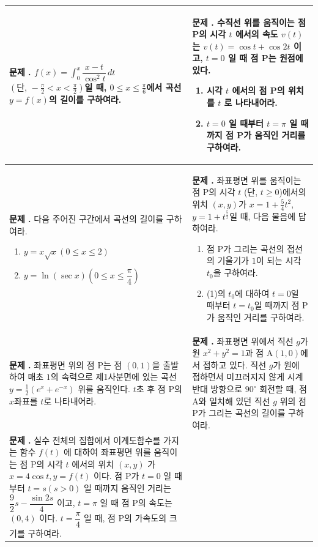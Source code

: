 \documentclass[10pt, a4paper]{article}
\newcounter{probcount}
\newcommand{\exercise}[1]{%
    \stepcounter{probcount}%
    \begin{minipage}[t][120mm][t]{0.44\textwidth}
        \small 
        \vspace{1mm}
        \noindent \textbf{문제 \arabic{probcount}.} #1
    \end{minipage}%
}
\begin{document}
\noindent
\begin{longtable}{p{} | p{}}
    
    \exercise{$f(x)=\int_{0}^{x} \dfrac{x-t}{\cos^2 t} \,dt$ $\left(\text{단, } -\frac{\pi}{2} < x < \frac{\pi}{2}\right)$일 때, $0 \le x \le \frac{\pi}{6}$에서 곡선 $y=f(x)$의 길이를 구하여라.} 
    & 
    \exercise{수직선 위를 움직이는 점 P의 시각 $t$ 에서의 속도 $v(t)$ 는 $v(t) = \cos t + \cos 2t$ 이고, $t=0$ 일 때 점 P는 원점에 있다. 
    \begin{enumerate}[label=(\arabic*), leftmargin=8mm, nosep]
        \item 시각 $t$ 에서의 점 P의 위치를 $t$ 로 나타내어라.
        \item $t=0$ 일 때부터 $t=\pi$ 일 때까지 점 P가 움직인 거리를 구하여라.
    \end{enumerate}} \\
    \hline 
    
    \exercise{다음 주어진 구간에서 곡선의 길이를 구하여라.
    \begin{enumerate}[label=(\arabic*), leftmargin=8mm, nosep]
        \item $y = x\sqrt{x} (0 \le x \le 2)$
        \item $y = \ln(\sec x) (0 \le x \le \dfrac{\pi}{4})$
    \end{enumerate}} 
    & 
    \exercise{좌표평면 위를 움직이는 점 $\text{P}$의 시각 $t$ (단, $t \ge 0$)에서의 위치 $(x, y)$가 $x = 1 + \frac{5}{4}t^2$, $y = 1 + t^{\frac{5}{2}}$일 때, 다음 물음에 답하여라.
    \begin{enumerate}
        \item[(1)] 점 $\text{P}$가 그리는 곡선의 접선의 기울기가 $1$이 되는 시각 $t_0$을 구하여라.
        \item[(2)] (1)의 $t_0$에 대하여 $t=0$일 때부터 $t=t_0$일 때까지 점 $\text{P}$가 움직인 거리를 구하여라.
    \end{enumerate}} \\


    \exercise{좌표평면 위의 점 $\text{P}$는 점 $(0, 1)$을 출발하여 매초 $1$의 속력으로 제1사분면에 있는 곡선 $y=\frac{1}{2}(e^x+e^{-x})$ 위를 움직인다. $t$초 후 점 $\text{P}$의 $x$좌표를 $t$로 나타내어라.} 
    & 
    \exercise{좌표평면 위에서 직선 $g$가 원 $x^2+y^2=1$과 점 $\text{A}(1, 0)$에서 접하고 있다. 직선 $g$가 원에 접하면서 미끄러지지 않게 시계 반대 방향으로 $90^\circ$ 회전할 때, 점 $\text{A}$와 일치해 있던 직선 $g$ 위의 점 $\text{P}$가 그리는 곡선의 길이를 구하여라.} \\
    \hline

    \exercise{실수 전체의 집합에서 이계도함수를 가지는 함수 $f(t)$ 에 대하여 좌표평면 위를 움직이는 점 P의 시각 $t$ 에서의 위치 $(x, y)$ 가 $x = 4\cos t, y = f(t)$ 이다. 점 P가 $t=0$ 일 때부터 $t=s(s > 0)$ 일 때까지 움직인 거리는 $\dfrac{9}{2}s - \dfrac{\sin 2s}{4}$ 이고, $t=\pi$ 일 때 점 P의 속도는 $(0, 4)$ 이다. $t=\dfrac{\pi}{4}$ 일 때, 점 P의 가속도의 크기를 구하여라.} 
    \\ 

\end{longtable}
\end{document}
